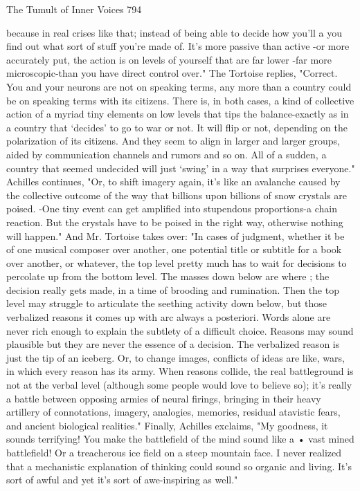 The Tumult of Inner Voices                                                         794

because in real crises like that; instead of being able to decide how you'll a you find
out what sort of stuff you're made of. It's more passive than active -or more accurately
put, the action is on levels of yourself that are far lower -far more microscopic-than
you have direct control over."
        The Tortoise replies, "Correct. You and your neurons are not on speaking
terms, any more than a country could be on speaking terms with its citizens. There is,
in both cases, a kind of collective action of a myriad tiny elements on low levels that
tips the balance-exactly as in a country that `decides' to go to war or not. It will flip or
not, depending on the polarization of its citizens. And they seem to align in larger and
larger groups, aided by communication channels and rumors and so on. All of a
sudden, a country that seemed undecided will just `swing' in a way that surprises
everyone."
        Achilles continues, "Or, to shift imagery again, it's like an avalanche caused
by the collective outcome of the way that billions upon billions of snow crystals are
poised. -One tiny event can get amplified into stupendous proportions-a chain
reaction. But the crystals have to be poised in the right way, otherwise nothing will
happen."
        And Mr. Tortoise takes over: "In cases of judgment, whether it be of one
musical composer over another, one potential title or subtitle for a book over another,
or whatever, the top level pretty much has to wait for decisions to percolate up from
the bottom level. The masses down below are where ; the decision really gets made,
in a time of brooding and rumination. Then the top level may struggle to articulate the
seething activity down below, but those verbalized reasons it comes up with arc
always a posteriori. Words alone are never rich enough to explain the subtlety of a
difficult choice. Reasons may sound plausible but they are never the essence of a
decision. The verbalized reason is just the tip of an iceberg. Or, to change images,
conflicts of ideas are like, wars, in which every reason has its army. When reasons
collide, the real battleground is not at the verbal level (although some people would
love to believe so); it's really a battle between opposing armies of neural firings,
bringing in their heavy artillery of connotations, imagery, analogies, memories,
residual atavistic fears, and ancient biological realities."
        Finally, Achilles exclaims, "My goodness, it sounds terrifying! You make the
battlefield of the mind sound like a • vast mined battlefield! Or a treacherous ice field
on a steep mountain face. I never realized that a mechanistic explanation of thinking
could sound so organic and living. It's sort of awful and yet it's sort of awe-inspiring
as well."

